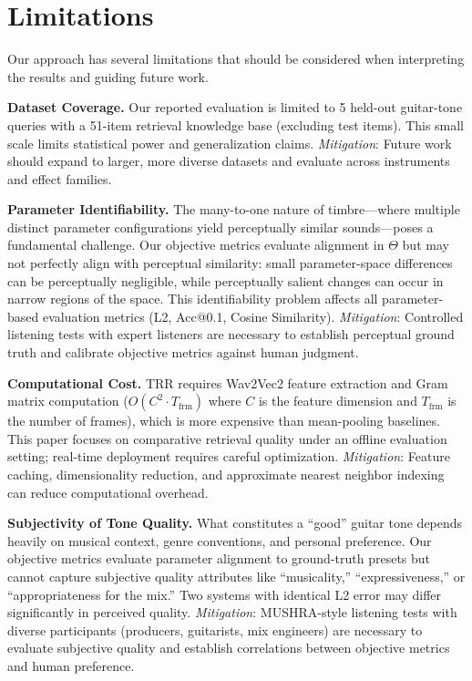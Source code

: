 \documentclass{article}
\begin{document}
\section{Limitations}
\label{sec:limitations}

Our approach has several limitations that should be considered when interpreting the results and guiding future work.

\textbf{Dataset Coverage.} Our reported evaluation is limited to 5 held-out guitar-tone queries with a 51-item retrieval knowledge base (excluding test items). This small scale limits statistical power and generalization claims. \textit{Mitigation}: Future work should expand to larger, more diverse datasets and evaluate across instruments and effect families.

\textbf{Parameter Identifiability.} The many-to-one nature of timbre—where multiple distinct parameter configurations yield perceptually similar sounds—poses a fundamental challenge. Our objective metrics evaluate alignment in $\Theta$ but may not perfectly align with perceptual similarity: small parameter-space differences can be perceptually negligible, while perceptually salient changes can occur in narrow regions of the space. This identifiability problem affects all parameter-based evaluation metrics (L2, Acc@0.1, Cosine Similarity). \textit{Mitigation}: Controlled listening tests with expert listeners are necessary to establish perceptual ground truth and calibrate objective metrics against human judgment.

\textbf{Computational Cost.} TRR requires Wav2Vec2 feature extraction and Gram matrix computation ($O(C^2 \cdot T_{\text{frm}})$ where $C$ is the feature dimension and $T_{\text{frm}}$ is the number of frames), which is more expensive than mean-pooling baselines. This paper focuses on comparative retrieval quality under an offline evaluation setting; real-time deployment requires careful optimization. \textit{Mitigation}: Feature caching, dimensionality reduction, and approximate nearest neighbor indexing can reduce computational overhead.

\textbf{Subjectivity of Tone Quality.} What constitutes a ``good'' guitar tone depends heavily on musical context, genre conventions, and personal preference. Our objective metrics evaluate parameter alignment to ground-truth presets but cannot capture subjective quality attributes like ``musicality,'' ``expressiveness,'' or ``appropriateness for the mix.'' Two systems with identical L2 error may differ significantly in perceived quality. \textit{Mitigation}: MUSHRA-style listening tests with diverse participants (producers, guitarists, mix engineers) are necessary to evaluate subjective quality and establish correlations between objective metrics and human preference.
\end{document}
